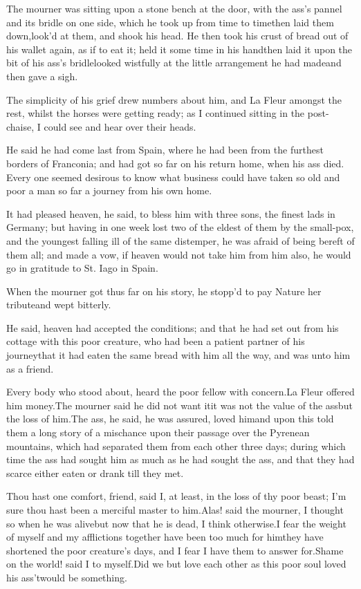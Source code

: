 \documentclass[twoside]{article}
\begin{document}
The mourner was sitting upon a stone bench at the door, with the ass’s
pannel and its bridle on one side, which he took up from time to
time\tsk then laid them down,\tsk look’d at them, and shook his head.  He then
took his crust of bread out of his wallet again, as if to eat it; held it
some time in his hand\tsk then laid it upon the bit of his ass’s
bridle\tsk looked wistfully at the little arrangement he had made\tsk and then
gave a sigh.

The simplicity of his grief drew numbers about him, and La Fleur amongst
the rest, whilst the horses were getting ready; as I continued sitting in
the post-chaise, I could see and hear over their heads.

\tsk He said he had come last from Spain, where he had been from the furthest
borders of Franconia; and had got so far on his return home, when his ass
died.  Every one seemed desirous to know what business could have taken
so old and poor a man so far a journey from his own home.

It had pleased heaven, he said, to bless him with three sons, the finest
lads in Germany; but having in one week lost two of the eldest of them by
the small-pox, and the youngest falling ill of the same distemper, he was
afraid of being bereft of them all; and made a vow, if heaven would not
take him from him also, he would go in gratitude to St. Iago in Spain.

When the mourner got thus far on his story, he stopp’d to pay Nature her
tribute\tsk and wept bitterly.

He said, heaven had accepted the conditions; and that he had set out from
his cottage with this poor creature, who had been a patient partner of
his journey\tsk that it had eaten the same bread with him all the way, and
was unto him as a friend.

Every body who stood about, heard the poor fellow with concern.\tsk La Fleur
offered him money.\tsk The mourner said he did not want it\tsk it was not the
value of the ass\tsk but the loss of him.\tsk The ass, he said, he was assured,
loved him\tsk and upon this told them a long story of a mischance upon their
passage over the Pyrenean mountains, which had separated them from each
other three days; during which time the ass had sought him as much as he
had sought the ass, and that they had scarce either eaten or drank till
they met.

Thou hast one comfort, friend, said I, at least, in the loss of thy poor
beast; I’m sure thou hast been a merciful master to him.\tsk Alas! said the
mourner, I thought so when he was alive\tsk but now that he is dead, I think
otherwise.\tsk I fear the weight of myself and my afflictions together have
been too much for him\tsk they have shortened the poor creature’s days, and
I fear I have them to answer for.\tsk Shame on the world! said I to
myself.\tsk Did we but love each other as this poor soul loved his
ass\tsk ’twould be something.\tsk 
\end{document}
